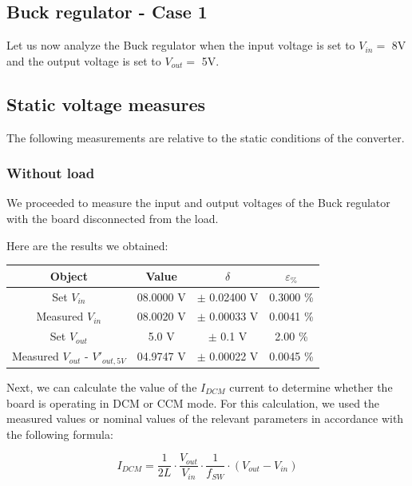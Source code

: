 \documentclass[../main.tex]{subfiles}
\begin{document}

\vspace{1cm}
\subsection{Buck regulator - Case 1}

Let us now analyze the Buck regulator when the input voltage is set to $V_{in} = $ 8V and the output voltage is set to $V_{out} = $ 5V.

\subsection*{Static voltage measures}

The following measurements are relative to the static conditions of the converter.

\subsubsection*{Without load}

We proceeded to measure the input and output voltages of the Buck regulator with the board disconnected from the load.

Here are the results we obtained:

\begin{center}
\begin{tabular}{c c c c}
\textbf{Object} & \textbf{Value} & $\delta$ & $\varepsilon_{\%}$  \\
\hline
Set $V_{in}$ & 08.0000 V & $\pm$ 0.02400 V & 0.3000 \% \\ 
\hline
Measured $V_{in}$ &  08.0020 V  & $\pm$ 0.00033 V &  0.0041 \%  \\ 
\hline
Set $V_{out}$ & 5.0 V  & $\pm$ 0.1 V  & 2.00 \%\\ 
\hline
Measured $V_{out}$ - $V'_{out,5V}$  & 04.9747 V  & $\pm$ 0.00022 V  & 0.0045 \% \\ 
\end{tabular}
\end{center}

Next, we can calculate the value of the $I_{DCM}$ current to determine whether the board is operating in DCM or CCM mode.
For this calculation, we used the measured values or nominal values of the relevant parameters in accordance with the following formula:

\[I_{DCM} = \frac{1}{2L} \cdot \frac{V_{out}}{V_{in}} \cdot \frac{1}{f_{SW}} \cdot (V_{out} - V_{in})\]\ 
\end{document}
